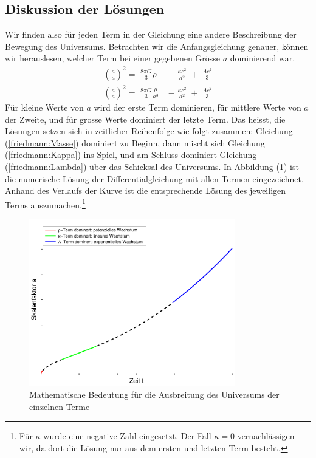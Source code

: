 \begin{refsection}
\subsection*{Diskussion der Lösungen}
Wir finden also für jeden Term in der Gleichung eine andere Beschreibung der Bewegung des Universums. Betrachten wir die Anfangsgleichung genauer, können wir herauslesen, welcher Term bei einer gegebenen Grösse $a$ dominierend war.
\begin{align*}
\left(\frac{\dot{a}}{a}\right) ^2 =\;\frac{8 \pi G}{3} \rho\; &- \;\frac{\kappa c^2}{a^2}\; + \;\frac{\Lambda c^2}{3} \\
\left(\frac{\dot{a}}{a}\right) ^2 = \;\frac{8 \pi G}{3} \frac{\mu}{a^3}\; &-\;\frac{\kappa c^2}{a^2}\; +\; \frac{\Lambda c^2}{3}
\end{align*}
Für kleine Werte von $a$ wird der erste Term dominieren, für mittlere Werte von $a$ der Zweite, und für grosse Werte dominiert der letzte Term. Das heisst, die Lösungen setzen sich in zeitlicher Reihenfolge wie folgt zusammen:
Gleichung (\ref{friedmann:Masse})  dominiert zu Beginn, dann mischt sich Gleichung (\ref{friedmann:Kappa}) ins Spiel, und am Schluss dominiert Gleichung (\ref{friedmann:Lambda}) über das Schicksal des Universums. In Abbildung (\ref{friedmann:mathematischFriedmann}) ist die numerische Lösung der Differentialgleichung mit allen Termen eingezeichnet. Anhand des Verlaufs der Kurve ist die entsprechende Lösung des jeweiligen Terms auszumachen.\footnote{Für $\kappa$ wurde eine negative Zahl eingesetzt. Der Fall $\kappa = 0$ vernachlässigen wir, da dort die Lösung nur aus dem ersten und letzten Term besteht.}
\begin{figure}[h]
	\centering
	\includegraphics[width = 0.8\textwidth]{friedmann/images/mathematischFriedmann.pdf}
	\caption{Mathematische Bedeutung für die Ausbreitung des Universums der einzelnen Terme}
	\label{friedmann:mathematischFriedmann}
\end{figure}%

\end{refsection}
